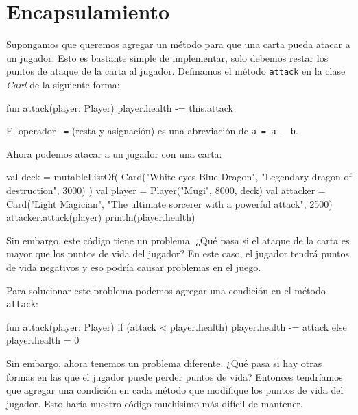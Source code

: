 
\section{Encapsulamiento}
  Supongamos que queremos agregar un método para que una carta pueda atacar a un jugador.
  Esto es bastante simple de implementar, solo debemos restar los puntos de ataque de la carta
  al jugador.
  Definamos el método \texttt{attack} en la clase \textit{Card} de la siguiente forma:

  \begin{kotlin}
    fun attack(player: Player) {
      player.health -= this.attack
    }
  \end{kotlin}

  \begin{note}
    El operador \texttt{-=} (resta y asignación) es una abreviación de \texttt{a = a - b}.
  \end{note}

  Ahora podemos atacar a un jugador con una carta:

  \begin{kotlin}
    val deck = mutableListOf(
      Card("White-eyes Blue Dragon", "Legendary dragon of destruction", 3000)
    )
    val player = Player("Mugi", 8000, deck)
    val attacker = 
      Card("Light Magician", "The ultimate sorcerer with a powerful attack", 2500)
    attacker.attack(player)
    println(player.health)
  \end{kotlin}

  Sin embargo, este código tiene un problema.
  ¿Qué pasa si el ataque de la carta es mayor que los puntos de vida del jugador?
  En este caso, el jugador tendrá puntos de vida negativos y eso podría causar problemas en el
  juego.

  Para solucionar este problema podemos agregar una condición en el método \texttt{attack}:

  \begin{kotlin}
    fun attack(player: Player) {
      if (attack < player.health) {
        player.health -= attack
      } else {
        player.health = 0
      }
    }
  \end{kotlin}

  Sin embargo, ahora tenemos un problema diferente.
  ¿Qué pasa si hay otras formas en las que el jugador puede perder puntos de vida?
  Entonces tendríamos que agregar una condición en cada método que modifique los puntos de vida
  del jugador.
  Esto haría nuestro código muchísimo más difícil de mantener.


